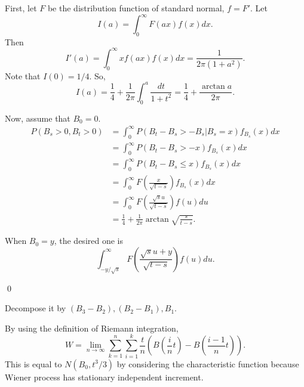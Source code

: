 \begin{problem}[7.1.1] \hfill

	First, let $F$ be the distribution function of standard normal, $f = F'$.
	Let
	\[
		I(a) = \int_0^\infty F(ax) f(x)dx.
	\]
	Then
	\[
		I'(a) = \int_0^\infty xf(ax)f(x) dx = \frac{1}{2\pi(1+a^2)}.
	\]
	Note that $I(0) = 1/4$.
	So,
	\[
		I(a) = \frac{1}{4} + \frac{1}{2\pi}\int_0^a \frac{dt}{1+t^2} = \frac{1}{4} + \frac{\arctan{a}}{2\pi}.
	\]

	Now, assume that $B_0 = 0$.
	\[
		\begin{split}
			P(B_s >0, B_t>0)
			&= \int_0^\infty P(B_t - B_s > -B_s \lvert B_s = x) f_{B_s}(x) dx \\
			&= \int_0^\infty P(B_t - B_s > -x) f_{B_s}(x) dx \\
			&= \int_0^\infty P(B_t - B_s \le x) f_{B_s}(x)dx \\
			&= \int_0^\infty F\left( \frac{x}{\sqrt{t-s}} \right) f_{B_s}(x) dx\\
			&= \int_0^\infty F\left( \frac{\sqrt{s}u}{\sqrt{t-s}} \right)f(u)du \\
			&= \frac{1}{4} + \frac{1}{2\pi}\arctan{ \sqrt{ \frac{s}{t-s}}}.
		\end{split}
	\]
	
	When $B_0 = y$, the desired one is
	\[
		\int_{-y/\sqrt{s}}^\infty F\left( \frac{\sqrt{s}u + y}{\sqrt{t-s}} \right) f(u) du.
	\]

	\qed
\end{problem}

\begin{problem}[7.1.2] \hfill
	
	Decompose it by $(B_3-B_2), (B_2 - B_1), B_1$.
\end{problem}

\begin{problem}[7.1.3] \hfill

	By using the definition of Riemann integration,
	\[
		W = \lim_{n\rightarrow \infty} \sum_{k=1}^n \sum_{i=1}^k \frac{t}{n}\left( B\left( \frac{i}{n}t \right)- B\left( \frac{i-1}{n}t \right) \right).
	\]
	This is equal to $N(B_0, t^3/3)$ by considering the characteristic function because Wiener process has stationary independent increment.
\end{problem}

